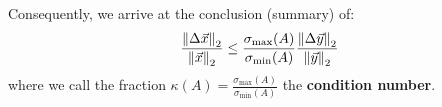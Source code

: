 Consequently, we arrive at the conclusion (summary) of:
\[
    \frac{{\| \Delta \vec{x} \|}_{2}^{}}{{\| \vec{x} \|}_{2}^{}} \leq \frac{\sigma_{\max}(A)}{\sigma_{\min}(A)} \frac{{\| \Delta \vec{y} \|}_{2}^{}}{{\| \vec{y} \|}_{2}^{}}
\]
where we call the fraction $\kappa(A) = \frac{\sigma_{\max}(A)}{\sigma_{\min}(A)}$ the \textbf{condition number}.
